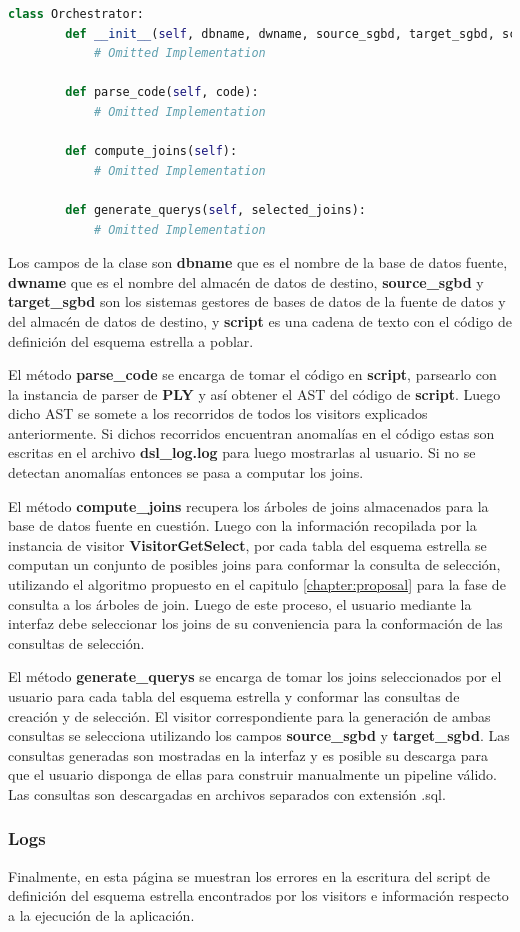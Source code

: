 \begin{lstlisting}[label={code:orchestrator}, caption={Clase Orchestrator}, language={python}]
    class Orchestrator:
        def __init__(self, dbname, dwname, source_sgbd, target_sgbd, script) -> None:
            # Omitted Implementation

        def parse_code(self, code):
            # Omitted Implementation

        def compute_joins(self):
            # Omitted Implementation

        def generate_querys(self, selected_joins):
            # Omitted Implementation
\end{lstlisting}

Los campos de la clase son \textbf{dbname} que es el nombre de la base de datos fuente, 
\textbf{dwname} que es el nombre del almacén de datos de destino, \textbf{source\_sgbd} y 
\textbf{target\_sgbd} son los sistemas gestores de bases de datos de la fuente de datos y 
del almacén de datos de destino, y \textbf{script} es una cadena de texto con el código 
de definición del esquema estrella a poblar.

El método \textbf{parse\_code} se encarga de tomar el código en \textbf{script}, parsearlo 
con la instancia de parser de \textbf{PLY} y as\'i obtener el AST del código de \textbf{script}. 
Luego dicho AST se somete a los recorridos de todos los visitors explicados anteriormente. Si dichos 
recorridos encuentran anomalías en el código estas son escritas en el archivo \textbf{dsl\_log.log} 
para luego mostrarlas al usuario. Si no se detectan anomalías entonces se pasa a computar los joins. 

El método \textbf{compute\_joins} recupera los \'arboles de joins almacenados para la base de datos 
fuente en cuestión. Luego con la información recopilada por la instancia de visitor \textbf{VisitorGetSelect}, 
por cada tabla del esquema estrella se computan un conjunto de posibles joins para conformar la consulta 
de selección, utilizando el algoritmo propuesto en el capitulo \ref{chapter:proposal} para la fase 
de consulta a los \'arboles de join. Luego de este proceso, el usuario mediante la interfaz debe seleccionar 
los joins de su conveniencia para la conformación de las consultas de selección. 

El método \textbf{generate\_querys} se encarga de tomar los joins seleccionados por el usuario para 
cada tabla del esquema estrella y conformar las consultas de creación y de selección. El visitor 
correspondiente para la generación de ambas consultas se selecciona utilizando los campos 
\textbf{source\_sgbd} y \textbf{target\_sgbd}. Las consultas generadas son mostradas en la interfaz y es 
posible su descarga para que el usuario disponga de ellas para construir manualmente un pipeline válido. 
Las consultas son descargadas en archivos separados con extensión .sql.

\subsubsection{Logs}

Finalmente, en esta página se muestran los errores en la escritura del script de definición del esquema
estrella encontrados por los visitors e información respecto a la ejecución de la aplicación.